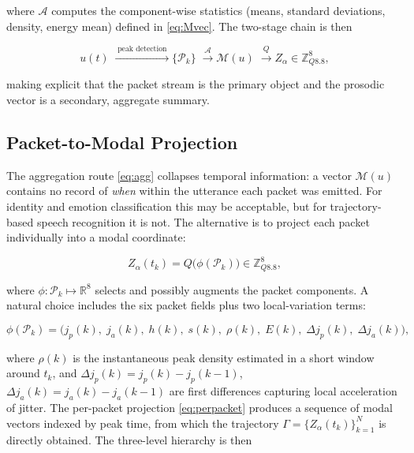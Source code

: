 \documentclass[12pt, a4paper]{article}
\begin{document}
where $\mathcal{A}$ computes the component-wise statistics (means, standard deviations, density, energy mean) defined in \eqref{eq:Mvec}. The two-stage chain is then

\begin{equation}
u(t)
\;\xrightarrow{\;\text{peak detection}\;}
\{\mathcal{P}_k\}
\;\xrightarrow{\;\mathcal{A}\;}
\mathcal{M}(u)
\;\xrightarrow{\;Q\;}
Z_\alpha \in \mathbb{Z}_{Q8.8}^8,
\label{eq:fullchain}
\end{equation}

making explicit that the packet stream is the primary object and the prosodic vector is a secondary, aggregate summary.

\subsection{Packet-to-Modal Projection}

The aggregation route \eqref{eq:agg} collapses temporal information: a vector $\mathcal{M}(u)$ contains no record of \emph{when} within the utterance each packet was emitted. For identity and emotion classification this may be acceptable, but for trajectory-based speech recognition it is not. The alternative is to project each packet individually into a modal coordinate:

\begin{equation}
Z_\alpha(t_k) = Q\bigl(\phi(\mathcal{P}_k)\bigr) \in \mathbb{Z}_{Q8.8}^8,
\label{eq:perpacket}
\end{equation}

where $\phi : \mathcal{P}_k \mapsto \mathbb{R}^8$ selects and possibly augments the packet components. A natural choice includes the six packet fields plus two local-variation terms:

\begin{equation}
\phi(\mathcal{P}_k) = \bigl(j_p(k),\; j_a(k),\; h(k),\; s(k),\; \rho(k),\; E(k),\; \Delta j_p(k),\; \Delta j_a(k)\bigr),
\label{eq:phi}
\end{equation}

where $\rho(k)$ is the instantaneous peak density estimated in a short window around $t_k$, and $\Delta j_p(k) = j_p(k) - j_p(k-1)$, $\Delta j_a(k) = j_a(k) - j_a(k-1)$ are first differences capturing local acceleration of jitter. The per-packet projection \eqref{eq:perpacket} produces a sequence of modal vectors indexed by peak time, from which the trajectory $\Gamma = \{Z_\alpha(t_k)\}_{k=1}^N$ is directly obtained. The three-level hierarchy is then
\end{document}
